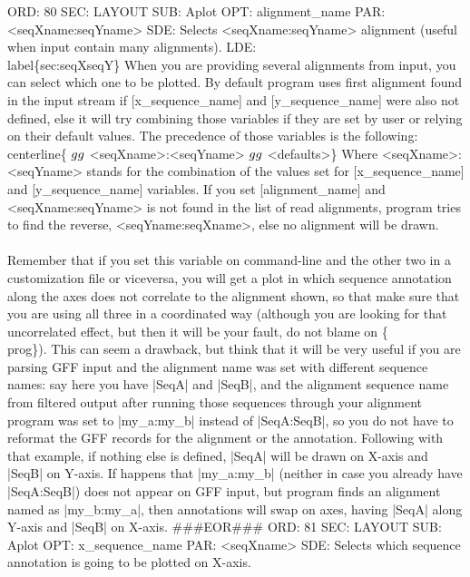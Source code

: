 \documentclass[11pt]{article}
\begin{document}
ORD: 80
SEC: LAYOUT
SUB: Aplot
OPT: alignment_name
PAR: <seqXname:seqYname>
SDE: Selects <seqXname:seqYname> alignment (useful when input contain many alignments).
LDE: 
\\label\{sec:seqXseqY\}
When you are providing several alignments from input, you can select which one
to be plotted. By default program uses first alignment found in the input 
stream if [x_sequence_name] and [y_sequence_name] were also not defined, else
it will try combining those variables if they are set by user or relying on 
their default values. The precedence of those variables is the following:
\\centerline\{<seqXname:seqYname> $\\gg$ <seqXname>:<seqYname> $\\gg$ <defaults>\}
Where <seqXname>:<seqYname> stands for the combination of the values set for
[x_sequence_name] and [y_sequence_name] variables.
If you set [alignment_name] and <seqXname:seqYname> is not found in the list
of read alignments, program tries to find the reverse, <seqYname:seqXname>, 
else no alignment will be drawn. \\\\
Remember that if you set this variable on 
command-line and the other two in a customization file or viceversa, you will 
get a plot in which sequence annotation along the axes does not correlate to
the alignment shown, so that make sure that you are using all three in a 
coordinated way (although you are looking for that uncorrelated effect, but 
then it will be your fault, do not blame on \{\\prog\}). This can seem a drawback,
but think that it will be very useful if you are parsing GFF input and the 
alignment name was set with different sequence names: say here you have |SeqA|
and |SeqB|, and the alignment sequence name from filtered output after running
those sequences through your alignment program was set to |my_a:my_b| instead
of |SeqA:SeqB|, so you do not have to reformat the GFF records for the 
alignment or the annotation. Following with that example, if nothing else is 
defined, |SeqA| will be drawn on X-axis and |SeqB| on Y-axis. If happens that
|my_a:my_b| (neither in case you already have |SeqA:SeqB|) does not appear on
GFF input, but program finds an alignment named as |my_b:my_a|, then 
annotations will swap on axes, having |SeqA| along Y-axis and |SeqB| on X-axis.
###EOR###
ORD: 81
SEC: LAYOUT
SUB: Aplot
OPT: x_sequence_name
PAR: <seqXname>
SDE: Selects which sequence annotation is going to be plotted on X-axis.
\end{document}
